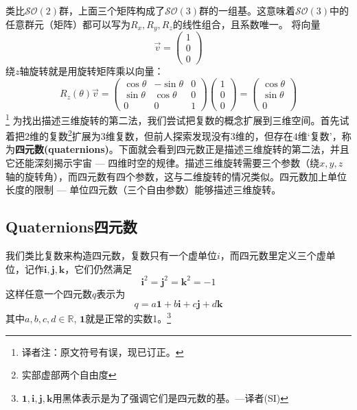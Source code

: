 类比$\mathcal{SO}(2)$群，上面三个矩阵构成了$\mathcal{SO}(3)$群的一组基。这意味着$\mathcal{SO}(3)$中的任意群元（矩阵）都可以写为$R_x, R_y, R_z$的线性组合，且系数唯一。
将向量
\begin{equation*}
\vec{v} = \begin{pmatrix}
			1 \\ 0 \\ 0
		\end{pmatrix}
\end{equation*}
绕$z$轴旋转就是用旋转矩阵乘以向量：
\begin{equation}
\label{equ3.24}
R_z(\theta) \vec{v} =
	\begin{pmatrix}
		\cos \theta & -\sin \theta & 0 \\
		\sin \theta & \cos \theta & 0 \\
		0 & 0 & 1
	\end{pmatrix}
	\begin{pmatrix}
		1 \\ 0 \\ 0
	\end{pmatrix}
=
	\begin{pmatrix}
		\cos \theta \\ \sin \theta \\ 0
	\end{pmatrix}
\end{equation} \footnote{译者注：原文符号有误，现已订正。}
为找出描述三维旋转的第二法，我们尝试把复数的概念扩展到三维空间。首先试着把$2$维的复数\footnote{实部虚部两个自由度}扩展为$3$维复数，但前人探索发现没有$3$维的，但存在$4$维‘复数’，称为{\bf 四元数(quaternions)}。下面就会看到四元数正是描述三维旋转的第二法，并且它还能深刻揭示宇宙 --- 四维时空的规律。描述三维旋转需要三个参数（绕$x,y,z$轴的旋转角），而四元数有四个参数，这与二维旋转的情况类似。四元数加上单位长度的限制 --- 单位四元数（三个自由参数）能够描述三维旋转。

\subsection[四元数]{Quaternions\quad 四元数}
\label{sec3.3.1}
我们类比复数来构造四元数，复数只有一个虚单位$i$，而四元数里定义三个虚单位，记作$\mathbf{i,j,k}$，它们仍然满足
\begin{equation}
\label{equ3.25}
\mathbf{i}^2 = \mathbf{j}^2 = \mathbf{k}^2 = -1
\end{equation}
这样任意一个四元数$q$表示为
\begin{equation}
\label{equ3.26}
q = a\mathbf{1} + b\mathbf{i} + c\mathbf{j} + d\mathbf{k}
\end{equation}
其中$a, b, c, d \in \mathbb{R}$, $\mathbf{1}$就是正常的实数1。\footnote{$\mathbf{1,i,j,k}$用黑体表示是为了强调它们是四元数的基。---译者(SI)}

